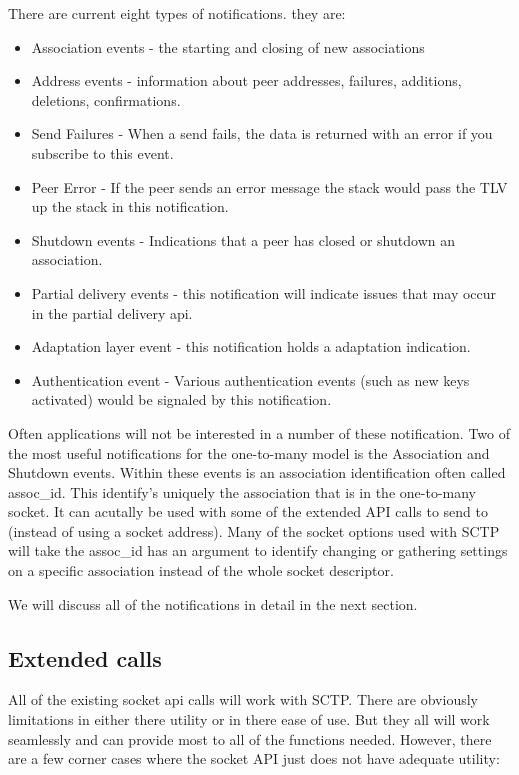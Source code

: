 \documentclass[conference]{IEEEtran}
\begin{document}
There are current eight types of notifications. they are:
\begin{itemize}
 \item  Association events - the starting and closing of new associations
 \item  Address events - information about peer addresses, failures, additions, deletions, confirmations.
 \item  Send Failures - When a send fails, the data is returned with an error if you subscribe to this event.
 \item  Peer Error - If the peer sends an error message the stack would pass the TLV up the stack in this notification.
 \item  Shutdown events - Indications that a peer has closed or shutdown an association.
 \item  Partial delivery events - this notification will indicate issues that may occur in the partial delivery api.
 \item  Adaptation layer event - this notification holds a adaptation indication.
 \item  Authentication event - Various authentication events (such as new keys activated) would be signaled by this notification.
 \end{itemize}

Often applications will not be interested in a number of these notification. Two of the most
useful notifications for the one-to-many model is the Association and Shutdown events. Within
these events is an association identification often called assoc\_id. This identify's uniquely the
association that is in the one-to-many socket. It can acutally be used with some of the extended
API calls to send to (instead of using a socket address).  Many of the socket options used with
SCTP will take the assoc\_id has an argument to identify changing or gathering settings on
a specific association instead of the whole socket descriptor.

We will discuss all of the notifications in detail in the next section.

\subsection{Extended calls}

All of the existing socket api calls will work with SCTP. There are
obviously limitations in either there utility or in there ease of use.
But they all will work seamlessly and can provide most to all of
the functions needed. However, there are a few corner cases
where the socket API just does not have adequate utility:
\end{document}
